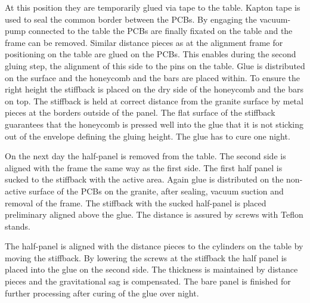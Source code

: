 \documentclass[
twoside,            %
BCOR1.4cm,          %
10pt,               %
headings=normal,    %
headsepline,        %
clearplainpage,		%
final,              %
div=14,
open=right,
bibliography=toc
]{scrreprt}
\begin{document}
At this position they are temporarily glued via tape to the table.
Kapton tape is used to seal the common border between the PCBs.
By engaging the vacuum-pump connected to the table the PCBs are finally fixated on the table and the frame can be removed.
Similar distance pieces as at the alignment frame for positioning on the table are glued on the PCBs. 
This enables during the second gluing step, the alignment of this side to the pins on the table.
Glue is distributed on the surface and the honeycomb and the bars are placed within.
To ensure the right height the stiffback is placed on the dry side of the honeycomb and the bars on top.
The stiffback is held at correct distance from the granite surface by metal pieces at the borders outside of the panel.
The flat surface of the stiffback guarantees that the honeycomb is pressed well into the glue that it is not sticking out of the envelope defining the gluing height.
The glue has to cure one night.

On the next day the half-panel is removed from the table. 
The second side is aligned with the frame the same way as the first side.
The first half panel is sucked to the stiffback with the active area.
Again glue is distributed on the non-active surface of the PCBs on the granite, after sealing, vacuum suction and removal of the frame.
The stiffback with the sucked half-panel is placed preliminary aligned above the glue. 
The distance is assured by screws with Teflon stands.

The half-panel is aligned with the distance pieces to the cylinders on the table by moving the stiffback.
By lowering the screws at the stiffback the half panel is placed into the glue on the second side.
The thickness is maintained by distance pieces and the gravitational sag is compensated.
The bare panel is finished for further processing after curing of the glue over night.
\end{document}
